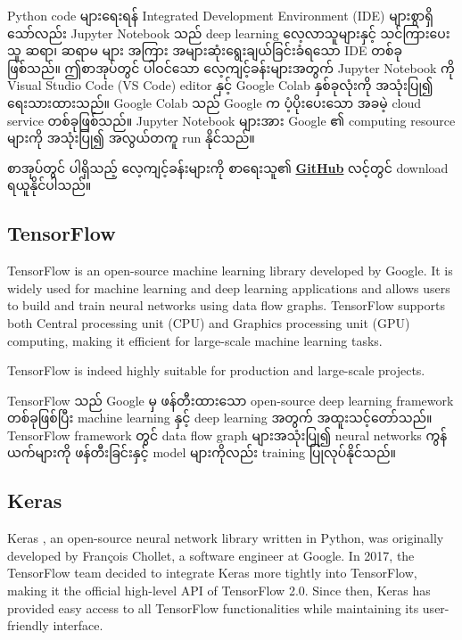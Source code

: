 \begin{remark}
    Python code များရေးရန် Integrated Development Environment (IDE) များစွာရှိသော်လည်း   Jupyter Notebook \cite{web:jupyter} သည် deep learning လေ့လာသူများနှင့် သင်ကြားပေးသူ ဆရာ၊ ဆရာမ များ အကြား အများဆုံးရွေးချယ်ခြင်းခံရသော IDE တစ်ခု ဖြစ်သည်။ ဤစာအုပ်တွင် ပါဝင်သော လေ့ကျင့်ခန်းများအတွက် Jupyter Notebook ကို Visual Studio Code (VS Code) editor \cite{web:VScode} နှင့် Google Colab \cite{web:googlecolab} နှစ်ခုလုံးကို အသုံးပြု၍ ရေးသားထားသည်။  Google Colab \cite{web:googlecolab} သည် Google က ပံ့ပိုးပေးသော အခမဲ့ cloud service တစ်ခုဖြစ်သည်။
    Jupyter Notebook များအား   Google ၏ computing resource များကို အသုံးပြု၍ အလွယ်တကူ run နိုင်သည်။

    စာအုပ်တွင် ပါရှိသည့် လေ့ကျင့်ခန်းများကို စာရေးသူ၏ \href{https://github.com/myothida}{\textbf{GitHub}} လင့်တွင် download ရယူနိုင်ပါသည်။

\end{remark}


\subsection{TensorFlow} \label{subsec:Tensor}

TensorFlow \cite{web:TensorFlow} is an open-source machine learning library developed by Google. It is widely used for machine learning and deep learning applications and allows users to build and train neural networks using data flow graphs. TensorFlow supports both Central processing unit (CPU) and Graphics processing unit (GPU) computing, making it efficient for large-scale machine learning tasks.

\begin{remark}
    TensorFlow is indeed highly suitable for production and large-scale projects.
\end{remark}

TensorFlow  \cite{web:TensorFlow} သည် Google မှ ဖန်တီးထားသော open-source deep learning framework တစ်ခုဖြစ်ပြီး machine learning နှင့် deep learning အတွက် အထူးသင့်တော်သည်။ TensorFlow framework တွင် data flow graph များအသုံးပြု၍  neural networks ကွန်ယက်များကို ဖန်တီးခြင်းနှင့်  model များကိုလည်း training ပြုလုပ်နိုင်သည်။

\subsection{Keras}\label{subsec:Kerans}
Keras \cite{web:Keras}, an open-source neural network library written in Python, was originally developed by François Chollet, a software engineer at Google. In 2017, the TensorFlow team decided to integrate Keras more tightly into TensorFlow, making it the official high-level API of TensorFlow 2.0. Since then, Keras has provided easy access to all TensorFlow functionalities while maintaining its user-friendly interface.

